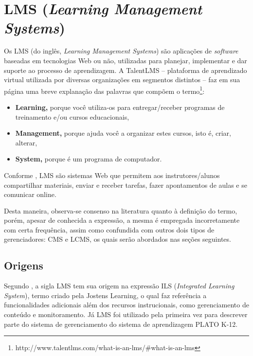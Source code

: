 \documentclass[12pt]{article}
\begin{document}
\section{LMS (\textit{Learning Management Systems})} \label{sec:lms}

Os LMS (do inglês, \textit{Learning Management Systems}) são aplicações de \textit{software} baseadas em tecnologias Web ou não, utilizadas para 
planejar, implementar e dar suporte ao processo de aprendizagem. A TalentLMS -- plataforma de aprendizado virtual utilizada por diversas 
organizações em segmentos distintos -- faz em sua página uma breve explanação das 
palavras que compõem o termo\footnote{http://www.talentlms.com/what-is-an-lms/\#what-is-an-lms}:

\begin{itemize}
 \setlength\itemsep{0.5em}
 \item \textbf{Learning,} porque você utiliza-os para entregar/receber programas de treinamento e/ou cursos educacionais, 
 \item \textbf{Management,} porque ajuda você a organizar estes cursos, isto é, criar, alterar,
 \item \textbf{System, } porque é um programa de computador.
\end{itemize}

Conforme \cite{lonn2009saving}, LMS são sistemas Web que permitem aos instrutores/alunos compartilhar materiais, enviar e receber tarefas, fazer 
apontamentos de aulas e se comunicar online. 

Desta maneira, observa-se consenso na literatura quanto à definição do termo, porém, apesar de 
conhecida a expressão, a mesma é empregada incorretamente com certa frequência, assim como confundida com outros dois tipos de gerenciadores: 
CMS e LCMS, os quais serão abordados nas seções seguintes.

\subsection{Origens}

Segundo \cite{watson2007learning}, a sigla LMS tem sua origem na expressão ILS (\textit{Integrated Learning System}), termo criado pela Jostens 
Learning, o qual faz referência a funcionalidades adicionais além dos recursos instrucionais, como gerenciamento de conteúdo e monitoramento. 
Já LMS foi utilizado pela primeira vez para descrever parte do sistema de gerenciamento do sistema de aprendizagem PLATO K-12.
\end{document}
